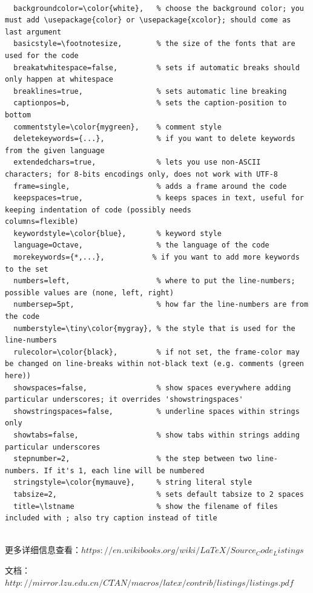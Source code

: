 \documentclass[UTF8]{book}
\begin{document}
{{\begin{lstlisting}

  backgroundcolor=\color{white},   % choose the background color; you must add \usepackage{color} or \usepackage{xcolor}; should come as last argument
  basicstyle=\footnotesize,        % the size of the fonts that are used for the code
  breakatwhitespace=false,         % sets if automatic breaks should only happen at whitespace
  breaklines=true,                 % sets automatic line breaking
  captionpos=b,                    % sets the caption-position to bottom
  commentstyle=\color{mygreen},    % comment style
  deletekeywords={...},            % if you want to delete keywords from the given language
  extendedchars=true,              % lets you use non-ASCII characters; for 8-bits encodings only, does not work with UTF-8
  frame=single,	                   % adds a frame around the code
  keepspaces=true,                 % keeps spaces in text, useful for keeping indentation of code (possibly needs 				columns=flexible)
  keywordstyle=\color{blue},       % keyword style
  language=Octave,                 % the language of the code
  morekeywords={*,...},           % if you want to add more keywords to the set
  numbers=left,                    % where to put the line-numbers; possible values are (none, left, right)
  numbersep=5pt,                   % how far the line-numbers are from the code
  numberstyle=\tiny\color{mygray}, % the style that is used for the line-numbers
  rulecolor=\color{black},         % if not set, the frame-color may be changed on line-breaks within not-black text (e.g. comments (green here))
  showspaces=false,                % show spaces everywhere adding particular underscores; it overrides 'showstringspaces'
  showstringspaces=false,          % underline spaces within strings only
  showtabs=false,                  % show tabs within strings adding particular underscores
  stepnumber=2,                    % the step between two line-numbers. If it's 1, each line will be numbered
  stringstyle=\color{mymauve},     % string literal style
  tabsize=2,	                   % sets default tabsize to 2 spaces
  title=\lstname                   % show the filename of files included with ; also try caption instead of title
        
\end{lstlisting}

更多详细信息查看：$ https://en.wikibooks.org/wiki/LaTeX/Source_Code_Listings$

文档：$ http://mirror.lzu.edu.cn/CTAN/macros/latex/contrib/listings/listings.pdf$
}}
\vspace*{4em}
\end{document}
